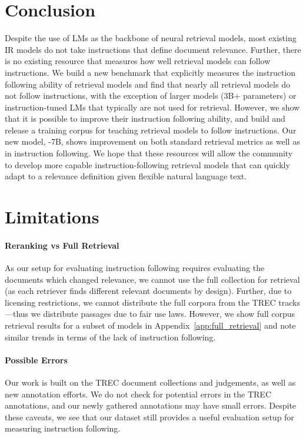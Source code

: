 \documentclass{article} %
\begin{document}
\section{Conclusion}
Despite the use of LMs as the backbone of neural retrieval models, most existing IR models do not take instructions that define document relevance. 
Further, there is no existing resource that measures how well retrieval models can follow instructions. 
We build a new benchmark that explicitly measures the instruction following ability of retrieval models and find that nearly all retrieval models do not follow instructions, with the exception of larger models (3B+ parameters) or instruction-tuned LMs that typically are not used for retrieval. 
However, we show that it is possible to improve their instruction following ability, and build and release a training corpus for teaching retrieval models to follow instructions.  
Our new model, \dataset\--7B, shows improvement on both standard retrieval metrics as well as in instruction following.
We hope that these resources will allow the community to develop more capable instruction-following retrieval models that can quickly adapt to a relevance definition given flexible natural language text.

\section{Limitations}
\paragraph{Reranking vs Full Retrieval} As our setup for evaluating instruction following requires evaluating the documents which changed relevance, we cannot use the full collection for retrieval (as each retriever finds different relevant documents by design). Further, due to licensing restrictions, we cannot distribute the full corpora from the TREC tracks---thus we distribute passages due to fair use laws. However, we show full corpus retrieval results for a subset of models in Appendix~\ref{app:full_retrieval} and note similar trends in terms of the lack of instruction following. 

\paragraph{Possible Errors} Our work is built on the TREC document collections and judgements, as well as new annotation efforts. We do not check for potential errors in the TREC annotations, and our newly gathered annotations may have small errors. Despite these caveats, we see that our dataset still provides a useful evaluation setup for measuring instruction following. 
\end{document}
